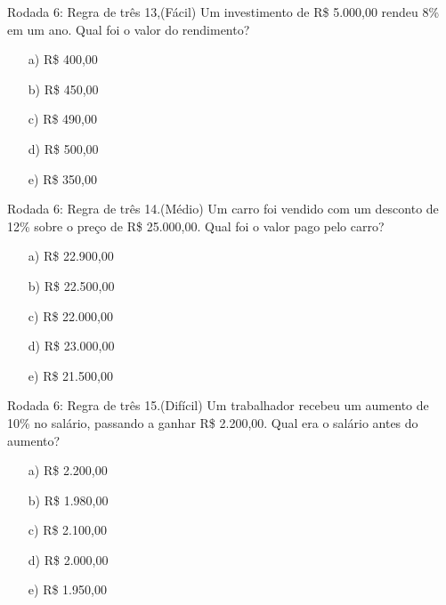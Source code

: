 \documentclass{beamer}
\begin{document}
\begin{frame}{Rodada 6: Regra de três}
    13,(Fácil) Um investimento de R\$ 5.000,00 rendeu 8\% em um ano. Qual foi o valor do rendimento?

\begin{itemize}
    \item[a)] \alert<2>{R\$ 400,00}
    \item[b)] R\$ 450,00
    \item[c)] R\$ 490,00
    \item[d)] R\$ 500,00
    \item[e)] R\$ 350,00
\end{itemize}
\end{frame}

\begin{frame}{Rodada 6: Regra de três }
    14.(Médio) Um carro foi vendido com um desconto de 12\% sobre o preço de R\$ 25.000,00. Qual foi o valor pago pelo carro?

\begin{itemize}
    \item[a)] R\$ 22.900,00
    \item[b)] R\$ 22.500,00
    \item[c)] \alert<2>{R\$ 22.000,00}
    \item[d)] R\$ 23.000,00
    \item[e)] R\$ 21.500,00
\end{itemize}

\end{frame}

\begin{frame}{Rodada 6: Regra de três }
    15.(Difícil) Um trabalhador recebeu um aumento de 10\% no salário, passando a ganhar R\$ 2.200,00. Qual era o salário antes do aumento?

\begin{itemize}
    \item[a)] R\$ 2.200,00
    \item[b)] R\$ 1.980,00
    \item[c)] R\$ 2.100,00
    \item[d)] \alert<2>{R\$ 2.000,00}
    \item[e)] R\$ 1.950,00
\end{itemize}

\end{frame}
\end{document}
